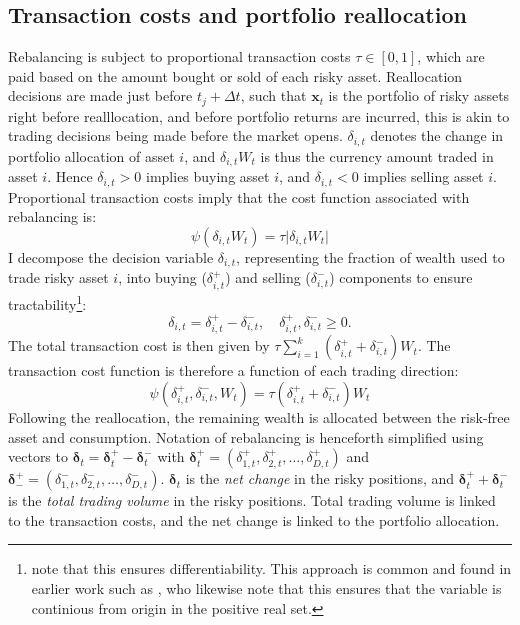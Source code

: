 \documentclass[11pt]{article}
\begin{document}
\subsection{Transaction costs and portfolio reallocation} \label{Subsection: Transaction-costs}
Rebalancing is subject to proportional transaction costs \(\tau \in [0,1]\), which are paid based on
the amount bought or sold of each risky asset. 
Reallocation decisions are made just before \(t_j + \Delta t\), such that \( \mathbf{x}_{t} \)
is the portfolio of risky assets right before realllocation, and before portfolio returns are incurred, this is akin to trading decisions being made before the market opens.
\(\delta_{i,t}\) denotes the change in portfolio allocation of asset \( i \),
and \(\delta_{i,t} W_{t}\) is thus the currency amount traded in asset \(i\).
Hence \(\delta_{i,t} >0 \) implies buying asset \(i\), and \(\delta_{i,t} <0 \) implies selling asset \(i\).
Proportional transaction costs imply that the cost function associated with rebalancing is:
\begin{equation} 
  \label{eq:Prop_Transaction_Cost}
  \psi (\delta_{i,t} W_t ) = \tau \lvert \delta_{i,t} W_t \rvert 
\end{equation}
I decompose the decision variable \(\delta_{i,t}\), representing the fraction of wealth used to trade
risky asset \(i\), into buying (\(\delta^+_{i,t}\)) and selling (\(\delta^-_{i,t}\)) components 
to ensure tractability\footnote{\textcite{Scheidegger2023} note that this ensures differentiability.
This approach is common and found in earlier work such as \textcite{Aikan1996}, 
who likewise note that this ensures that the variable is continious from origin in the positive real set.}:
\[
\delta_{i,t} = \delta^+_{i,t} - \delta^-_{i,t}, \quad \delta^+_{i,t}, \delta^-_{i,t} \geq 0.
\]
The total transaction cost is then given by \(\tau \sum_{i=1}^k (\delta^+_{i,t} + \delta^-_{i,t}) W_t\).
The transaction cost function is therefore a function of each trading direction:
\begin{equation} 
  \label{eq:Prop_Transaction_Cost_Direction}
  \psi (\delta^{+}_{i,t}, \delta^{-}_{i,t} , W_t ) = \tau (\delta^{+}_{i,t} + \delta^{-}_{i,t} ) W_t 
\end{equation}
Following the reallocation, the remaining wealth is allocated between the risk-free asset and consumption.
Notation of rebalancing is henceforth simplified using vectors to \(\boldsymbol{\delta}_t = \boldsymbol{\delta}^+_{t} - \boldsymbol{\delta}^-_{t} \)
with \( \boldsymbol{\delta}^+_{t} = (\delta^{+}_{1,t} ,  \delta^{+}_{2,t} , \ldots ,  \delta^{+}_{D,t} ) \) and \( \boldsymbol{\delta}^+_{-} = (\delta^{-}_{1,t} ,  \delta^{-}_{2,t} , \ldots ,  \delta^{-}_{D,t} ) \).
\(\boldsymbol{\delta}_t \) is the \textit{net change} in the risky positions, and \(\boldsymbol{\delta}^+_{t} + \boldsymbol{\delta}^-_{t} \) is 
the \textit{total trading volume} in the risky positions. Total trading volume is linked to the transaction costs, and the net change is linked to the portfolio allocation.
\end{document}
